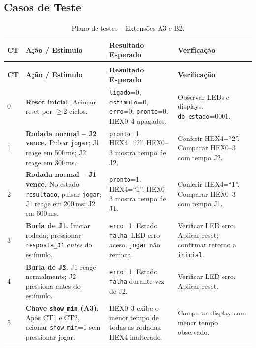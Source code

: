 \documentclass[12pt,a4paper]{article}
\begin{document}
\subsection{Casos de Teste}

\begin{longtable}{>{\centering}p{0.5cm}
                  p{4.1cm} p{4.1cm} p{4.3cm}}
\caption{Plano de testes -- Extensões A3 e B2.}
\label{tab:plano}\\
\toprule
\textbf{CT} & \textbf{Ação / Estímulo} & \textbf{Resultado Esperado}
            & \textbf{Verificação} \\
\midrule\endfirsthead
\multicolumn{4}{c}{\textit{(continuação)}}\\
\toprule
\textbf{CT} & \textbf{Ação / Estímulo} & \textbf{Resultado Esperado}
            & \textbf{Verificação} \\
\midrule\endhead
\bottomrule\endfoot

0 & \textbf{Reset inicial.} Acionar reset por $\geq$2 ciclos.
  & \texttt{ligado}=0, \texttt{estimulo}=0, \texttt{erro}=0,
    \texttt{pronto}=0. HEX0--4 apagados.
  & Observar LEDs e displays. \texttt{db\_estado}=0001. \\
\midrule

1 & \textbf{Rodada normal -- J2 vence.} Pulsar \texttt{jogar};
    J1 reage em 500\,ms; J2 reage em 300\,ms.
  & \texttt{pronto}=1. HEX4=``2''. HEX0--3 mostra tempo de J2.
  & Conferir HEX4=``2''. Comparar HEX0--3 com tempo J2. \\
\midrule

2 & \textbf{Rodada normal -- J1 vence.} No estado \texttt{resultado},
    pulsar \texttt{jogar}; J1 reage em 200\,ms; J2 em 600\,ms.
  & \texttt{pronto}=1. HEX4=``1''. HEX0--3 mostra tempo de J1.
  & Conferir HEX4=``1''. Comparar HEX0--3 com tempo J1. \\
\midrule

3 & \textbf{Burla de J1.} Iniciar rodada; pressionar
    \texttt{resposta\_J1} \emph{antes} do estímulo.
  & \texttt{erro}=1. Estado \texttt{falha}. LED erro aceso.
    \texttt{jogar} não reinicia.
  & Verificar LED erro. Aplicar reset; confirmar retorno a
    \texttt{inicial}. \\
\midrule

4 & \textbf{Burla de J2.} J1 reage normalmente; J2 pressiona antes
    do estímulo.
  & \texttt{erro}=1. Estado \texttt{falha} durante vez de J2.
  & Verificar LED erro. Aplicar reset. \\
\midrule

5 & \textbf{Chave \texttt{show\_min} (A3).} Após CT1 e CT2, acionar
    \texttt{show\_min}=1 sem pressionar jogar.
  & HEX0--3 exibe o menor tempo de todas as rodadas.
    HEX4 inalterado.
  & Comparar display com menor tempo observado. \\
\midrule


\end{longtable}
\end{document}
